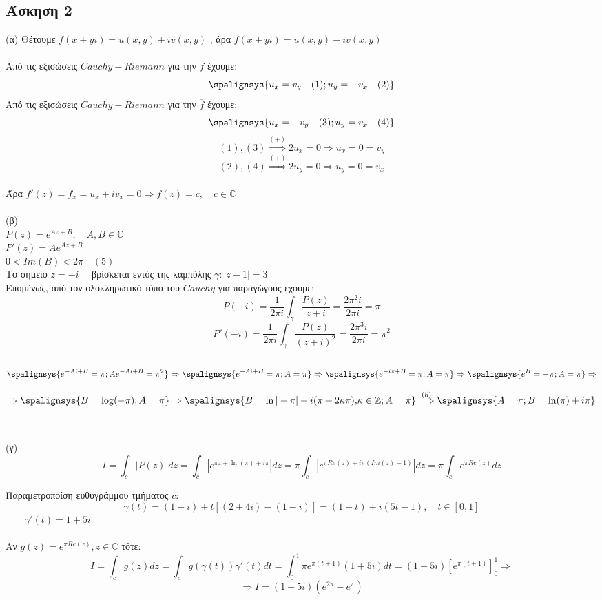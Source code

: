 \documentclass[12pt]{article}
\begin{document}
\newpage
 \subsection{Άσκηση 2}
(α) Θέτουμε $f(x+yi)=u(x,y)+iv(x,y)$ , άρα $\overline{f(x+yi)}=u(x,y)-iv(x,y)$
\\ \\
Από τις εξισώσεις $ Cauchy-Riemann $ για την $f$ έχουμε:
\[
\spalignsys {u_x=v_y \quad (1) ; u_y=-v_x \quad (2)}
\]
Από τις εξισώσεις $ Cauchy-Riemann $ για την $\overline{f}$ έχουμε:
\[
\spalignsys {u_x=-v_y \quad (3); u_y=v_x\quad (4)}
\]
$$ (1),(3)\overset{(+)}{\Longrightarrow}2u_x=0\Rightarrow u_x=0=v_y $$
$$ (2),(4)\overset{(+)}{\Longrightarrow}2u_y=0\Rightarrow u_y=0=v_x $$
\\
Άρα $f'(z)=f_x=u_x+iv_x=0\Rightarrow f(z)=c,\quad c\in\mathbb{C}$
\\ \\ 
(β)
\\
$ P(z)=e^{Az+B}, \quad A,B\in\mathbb{C} $\\
$ P'(z)=Ae^{Az+B} $\\
$ 0<Im(B)<2\pi \quad (5)$\\

Το σημείο $ z=-i \quad$ βρίσκεται εντός της καμπύλης $\gamma : |z-1|=3$
\\
Επομένως, από τον ολοκληρωτικό τύπο του $Cauchy$ για παραγώγους έχουμε:
$$ P(-i)=\frac{1}{2\pi i} \int_\gamma \frac{P(z)}{z+i}=\frac{2\pi^2 i}{2\pi i}=\pi $$
$$ P'(-i)=\frac{1}{2\pi i} \int_\gamma \frac{P(z)}{(z+i)^2}=\frac{2\pi^3 i}{2\pi i}=\pi^2 $$
\\
\[
\spalignsys {e^{-Ai+B}=\pi ;Ae^{-Ai+B}=\pi^2}
\Rightarrow
\spalignsys {e^{-Ai+B}=\pi ;A=\pi}
\Rightarrow
\spalignsys {e^{-i\pi+B}=\pi ;A=\pi}
\Rightarrow
\spalignsys {e^{B}=-\pi ;A=\pi}
\Rightarrow
\]

\[
\Rightarrow
\spalignsys {B=\log(-\pi) ;A=\pi}
\Rightarrow
\spalignsys {B=\ln|-\pi| + i ( \pi + 2\kappa \pi ) {,} \kappa\in\mathbb{Z} ; A=\pi}
\overset{(5)}{\Longrightarrow}
\spalignsys {A=\pi ; B=\ln(\pi) + i  \pi }
\]
\\ \\
(γ) 
$$ Ι=\int_{c}|P(z)|dz=\int_{c}|e^{\pi z+\ln(\pi)+i \pi}|dz=\pi\int_{c}|e^{\pi Re(z)+i\pi(Im(z)+1)}|dz=\pi\int_{c}e^{\pi Re(z)}dz$$

Παραμετροποίση ευθυγράμμου τμήματος $c$:
$$ \gamma(t)=(1-i)+t[(2+4i)-(1-i)]=(1+t)+i(5t-1),\quad t\in[0,1] $$
$ \qquad \gamma'(t)=1+5i $
\\ \\
Αν $g(z)=e^{\pi Re(z)} ,z\in\mathbb{C} $ τότε:
$$ Ι=\int_{c}g(z)dz=\int_{c}g(\gamma(t))\gamma'(t)dt= \int_{0}^{1} \pi e^{\pi (t+1) }(1+5i)dt=(1+5i)\left[e^{\pi (t+1) }\right]_{0}^{1}\Rightarrow$$
$$\Rightarrow I=(1+5i)(e^{2\pi}-e^{\pi}) $$
\end{document}
